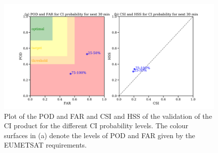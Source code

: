 \begin{figure}[htbp]
\centering
\includegraphics[width=\textwidth]{Grafiken/Abbildungen/validation_far_pod_hss_csi_plot.pdf}
\caption{Plot of the POD and FAR  and CSI and HSS of the validation of the CI product for the different CI probability levels. The colour surfaces in (a) denote the levels of POD and FAR given by the EUMETSAT requirements.}
\label{fig:validation_result2}
\end{figure}




